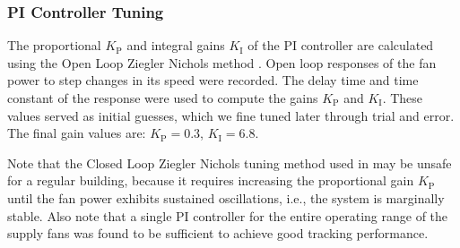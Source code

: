 

\subsubsection{PI Controller Tuning}\label{sec:PItuning}
The proportional $K_\text{P}$ and integral gains $K_\text{I}$ of the PI controller are calculated using the %
Open Loop Ziegler Nichols method \cite{Moderncontrol_book}. Open loop responses of the fan power to step changes in its speed were recorded. 
The delay time and time constant of the response were used to compute the gains $K_\text{P}$ and $K_\text{I}$.
These values served as initial guesses, which we fine tuned later through trial and error. 
The final gain values are: $K_\text{P} = 0.3$, $K_\text{I} = 6.8$.


Note that the Closed Loop Ziegler Nichols tuning method used in \cite{Vrettos:2016flexlab1} may be unsafe for a regular building, because it requires increasing the proportional gain $K_\text{P}$ until the fan power exhibits sustained oscillations, i.e., the system is marginally stable.
Also note that a single PI controller for the entire operating range of the supply fans was found to be sufficient to achieve good tracking performance.















